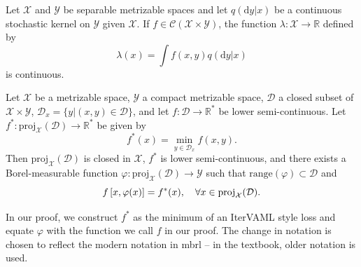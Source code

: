 \begin{proposition}[Proposition~7.30]
\label{prop:cvaml:730}
    Let $\mathcal{X}$ and $\mathcal{Y}$ be separable metrizable spaces and let $q(\mathrm{d}y|x)$ be a continuous stochastic kernel on $\mathcal{Y}$ given $\mathcal{X}$. If $f\in\mathcal{C}(\mathcal{X}\times \mathcal{Y})$, the function $\lambda: \mathcal{X} \rightarrow \mathbb{R}$ defined by
    \[
        \lambda(x) = \int f(x,y) q(\mathrm{d}y|x)
    \]
    is continuous.
\end{proposition}

\newcommand{\proj}{\text{proj}}
\begin{proposition}[Proposition~7.33]
\label{prop:cvaml:733}
    Let $\mathcal{X}$ be a metrizable space, $\mathcal{Y}$ a compact metrizable space, $\mathcal{D}$ a closed subset of $\mathcal{X}\times\mathcal{Y}$, $\mathcal{D}_x = \{y | (x,y) \in \mathcal{D} \}$, and let $f:\mathcal{D}\rightarrow \mathbb{R}^*$ be lower semi-continuous.
    Let $f^*:\proj_\mathcal{X}(\mathcal{D}) \rightarrow \mathbb{R}^*$ be given by \[
    f^*(x) = \min_{y \in \mathcal{D}_x} f(x,y).
    \]
    Then $\proj_\mathcal{X}(\mathcal{D})$ is closed in $\mathcal{X}$, $f^*$ is lower semi-continuous, and there exists a Borel-measurable function $\varphi: \proj_\mathcal{X}(\mathcal{D}) \rightarrow \mathcal{Y}$ such that $\text{range}(\varphi) \subset \mathcal{D}$ and \[
    f\squareb{x, \varphi(x)} = f^*(x), \quad \forall x \in \proj_\mathcal{X}(\mathcal{D}).
    \]
\end{proposition}

In our proof, we construct $f^*$ as the minimum of an IterVAML style loss and equate $\varphi$ with the function we call $f$ in our proof.
The change in notation is chosen to reflect the modern notation in \ac{mbrl} -- in the textbook, older notation is used.
\label{app:cvaml:conjecture}
